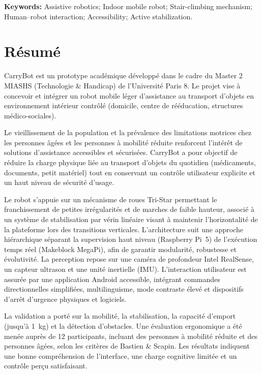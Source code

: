 \documentclass[12pt,a4paper]{article}
\begin{document}
\textbf{Keywords:} Assistive robotics; Indoor mobile robot; Stair-climbing mechanism; Human–robot interaction; Accessibility; Active stabilization.

\vspace{0.8cm}
\newpage
\section*{R\'esum\'e}

CarryBot est un prototype acad\'emique d\'evelopp\'e dans le cadre du Master 2 MIASHS (Technologie \& Handicap) de l’Universit\'e Paris 8. Le projet vise \`a concevoir et int\'egrer un robot mobile l\'eger d’assistance au transport d’objets en environnement int\'erieur contr\^ol\'e (domicile, centre de r\'e\'education, structures m\'edico-sociales).

Le vieillissement de la population et la pr\'evalence des limitations motrices chez les personnes \^ag\'ees et les personnes \`a mobilit\'e r\'eduite renforcent l’int\'er\^et de solutions d’assistance accessibles et s\'ecuris\'ees. CarryBot a pour objectif de r\'eduire la charge physique li\'ee au transport d’objets du quotidien (m\'edicaments, documents, petit mat\'eriel) tout en conservant un contr\^ole utilisateur explicite et un haut niveau de s\'ecurit\'e d’usage.

Le robot s’appuie sur un m\'ecanisme de roues Tri-Star permettant le franchissement de petites irr\'egularit\'es et de marches de faible hauteur, associ\'e \`a un syst\`eme de stabilisation par v\'erin lin\'eaire visant \`a maintenir l’horizontalit\'e de la plateforme lors des transitions verticales. L’architecture suit une approche hi\'erarchique s\'eparant la supervision haut niveau (Raspberry Pi~5) de l’ex\'ecution temps r\'eel (Makeblock MegaPi), afin de garantir modularit\'e, robustesse et \'evolutivit\'e. La perception repose sur une cam\'era de profondeur Intel RealSense, un capteur ultrason et une unit\'e inertielle (IMU). L’interaction utilisateur est assur\'ee par une application Android accessible, int\'egrant commandes directionnelles simplifi\'ees, multilinguisme, mode contraste \'elev\'e et dispositifs d’arr\^et d’urgence physiques et logiciels.

La validation a port\'e sur la mobilit\'e, la stabilisation, la capacit\'e d’emport (jusqu’\`a 1~kg) et la d\'etection d’obstacles. Une \'evaluation ergonomique a \'et\'e men\'ee aupr\`es de 12 participants, incluant des personnes \`a mobilit\'e r\'eduite et des personnes \^ag\'ees, selon les crit\`eres de Bastien \& Scapin. Les r\'esultats indiquent une bonne compr\'ehension de l’interface, une charge cognitive limit\'ee et un contr\^ole per\c{c}u satisfaisant.
\end{document}

